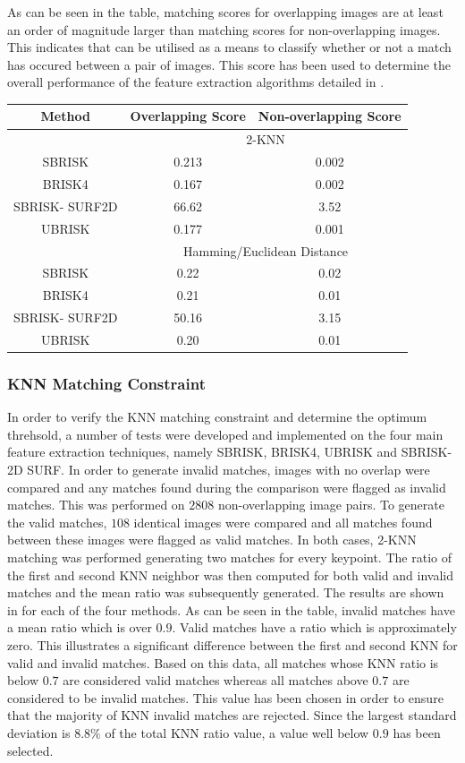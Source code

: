 \documentclass{article}
\begin{document}
As can be seen in the table, matching scores for overlapping images are at least an order of magnitude larger than matching scores for non-overlapping images. This indicates that  can be utilised as a means to classify whether or not a match has occured between a pair of images. This score has been used to determine the overall performance of the feature extraction algorithms detailed in .\\

\begin{table}
\begin{tabular}{|c|c|c|}
\hline 
Method & Overlapping Score & Non-overlapping Score\tabularnewline
\hline 
\hline 
 & \multicolumn{2}{c}{2-KNN}\tabularnewline
\hline 
SBRISK & 0.213 & 0.002\tabularnewline
\hline 
BRISK4 & 0.167 & 0.002\tabularnewline
\hline 
SBRISK- SURF2D & 66.62 & 3.52\tabularnewline
\hline 
UBRISK & 0.177 & 0.001\tabularnewline
\hline 
 & \multicolumn{2}{c}{Hamming/Euclidean Distance}\tabularnewline
\hline 
SBRISK & 0.22 & 0.02\tabularnewline
\hline 
BRISK4 & 0.21 & 0.01\tabularnewline
\hline 
SBRISK- SURF2D & 50.16 & 3.15\tabularnewline
\hline 
UBRISK & 0.20 & 0.01\tabularnewline
\hline 
\end{tabular}
\label{tab:matchingScoreCompare}
\end{table}

\subsubsection{KNN Matching Constraint}
\label{sec:knnMatchingConstraint}
In order to verify the KNN matching constraint and determine the optimum threhsold, a number of tests were developed and implemented on the four main feature extraction techniques, namely SBRISK, BRISK4, UBRISK and SBRISK-2D SURF. In order to generate invalid matches, images with no overlap were compared and any matches found during the comparison were flagged as invalid matches. This was performed on $2808$ non-overlapping image pairs. To generate the valid matches, $108$ identical images were compared and all matches found between these images were flagged as valid matches. In both cases, 2-KNN matching was performed generating two matches for every keypoint. The ratio of the first and second KNN neighbor was then computed for both valid and invalid matches and the mean ratio was subsequently generated. The results are shown in  for each of the four methods. As can be seen in the table, invalid matches have a mean ratio which is over $0.9$. Valid matches have a ratio which is approximately zero. This illustrates a significant difference between the first and second KNN for valid and invalid matches. Based on this data, all matches whose KNN ratio is below $0.7$ are considered valid matches whereas all matches above $0.7$ are considered to be invalid matches. This value has been chosen in order to ensure that the majority of KNN invalid matches are rejected. Since the largest standard deviation is $8.8\%$ of the total KNN ratio value, a value well below $0.9$ has been selected. \\
\end{document}
